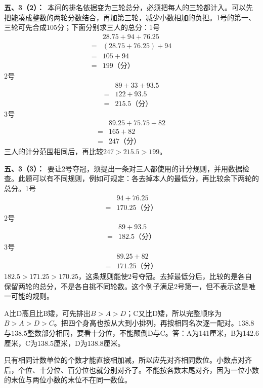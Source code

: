 \documentclass[multi=snippet,border=0pt]{standalone}
\newenvironment{snippet}[3]{\begin{minipage}{#1bp}\color{answerred}\fontsize{#2}{#3}\selectfont\raggedright}{\end{minipage}}
\begin{document}
\begin{snippet}{505}{11.5}{14}\textbf{五、3（2）：}\ 本问的排名依据变为三轮总分，必须把每人的三轮都计入。可以先把能凑成整数的两轮分数结合，再加第三轮，减少小数相加的负担。1号的第一、三轮可先合成105分；下面分别求三人的总分：1号\[\begin{aligned}&28.75+94+76.25\\={}&(28.75+76.25)+94\\={}&105+94\\={}&199\text{（分）}\end{aligned}\]2号\[\begin{aligned}&89+33+93.5\\={}&122+93.5\\={}&215.5\text{（分）}\end{aligned}\]3号\[\begin{aligned}&89.25+75.75+82\\={}&165+82\\={}&247\text{（分）}\end{aligned}\]三人的计分范围相同后，再比较\(247>215.5>199\)。\end{snippet}
\begin{snippet}{505}{11.5}{14}\textbf{五、3（3）：}\ 要让2号夺冠，须提出一条对三人都使用的计分规则，并用数据检查。此题可以有不同规则，例如可规定：各去掉本人的最低分，再比较余下两轮的总分。1号\[\begin{aligned}&94+76.25\\={}&170.25\text{（分）}\end{aligned}\]2号\[\begin{aligned}&89+93.5\\={}&182.5\text{（分）}\end{aligned}\]3号\[\begin{aligned}&89.25+82\\={}&171.25\text{（分）}\end{aligned}\]\(182.5>171.25>170.25\)，这条规则能使2号夺冠。去掉最低分后，比较的是各自保留两轮的总分，不是各自挑不同轮数。这个例子满足2号第一，但不表示这是唯一可能的规则。\end{snippet}
\begin{snippet}{505}{11.5}{14}A比D高且比B矮，可先排出\(B>A>D\)；C又比D矮，所以完整顺序为\(B>A>D>C\)。把四个身高也按从大到小排列，再按相同名次逐一配对。\(138.8\)与\(138.5\)整数部分相同，要看十分位，不能颠倒D与C。答：A为141厘米，B为142.6厘米，C为138.5厘米，D为138.8厘米。\end{snippet}
\begin{snippet}{505}{11.5}{14}只有相同计数单位的个数才能直接相加减，所以应先对齐相同数位。小数点对齐后，个位、十分位、百分位也就分别对齐了。不能按各数末尾对齐，因为一位小数的末位与两位小数的末位不在同一数位。\end{snippet}
\end{document}
